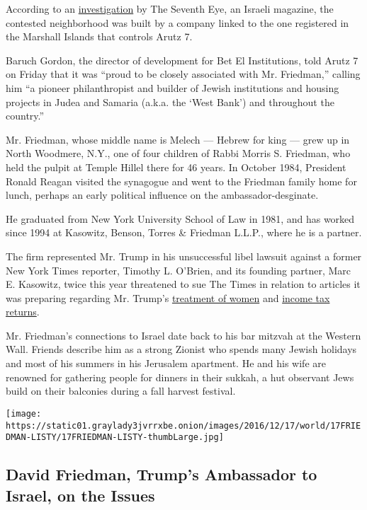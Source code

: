 According to an \href{http://www.the7eye.org.il/181976}{investigation}
by The Seventh Eye, an Israeli magazine, the contested neighborhood was
built by a company linked to the one registered in the Marshall Islands
that controls Arutz 7.

Baruch Gordon, the director of development for Bet El Institutions, told
Arutz 7 on Friday that it was ``proud to be closely associated with Mr.
Friedman,'' calling him ``a pioneer philanthropist and builder of Jewish
institutions and housing projects in Judea and Samaria (a.k.a. the `West
Bank') and throughout the country.''

Mr. Friedman, whose middle name is Melech --- Hebrew for king --- grew
up in North Woodmere, N.Y., one of four children of Rabbi Morris S.
Friedman, who held the pulpit at Temple Hillel there for 46 years. In
October 1984, President Ronald Reagan visited the synagogue and went to
the Friedman family home for lunch, perhaps an early political influence
on the ambassador-desginate.

He graduated from New York University School of Law in 1981, and has
worked since 1994 at Kasowitz, Benson, Torres \& Friedman L.L.P., where
he is a partner.

The firm represented Mr. Trump in his unsuccessful libel lawsuit against
a former New York Times reporter, Timothy L. O'Brien, and its founding
partner, Marc E. Kasowitz, twice this year threatened to sue The Times
in relation to articles it was preparing regarding Mr. Trump's
\href{https://www.nytimes3xbfgragh.onion/2016/05/15/us/politics/donald-trump-women.html}{treatment
of women} and
\href{https://www.nytimes3xbfgragh.onion/2016/10/02/us/politics/donald-trump-taxes.html?_r=0}{income
tax returns}.

Mr. Friedman's connections to Israel date back to his bar mitzvah at the
Western Wall. Friends describe him as a strong Zionist who spends many
Jewish holidays and most of his summers in his Jerusalem apartment. He
and his wife are renowned for gathering people for dinners in their
sukkah, a hut observant Jews build on their balconies during a fall
harvest festival.

\href{https://www.nytimes3xbfgragh.onion/interactive/2016/12/16/world/middleeast/David-Friedman-Israel-Palestinians-Trump-quotes.html}{}

\texttt{[image: https://static01.graylady3jvrrxbe.onion/images/2016/12/17/world/17FRIEDMAN-LISTY/17FRIEDMAN-LISTY-thumbLarge.jpg]}

\hypertarget{david-friedman-trumps-ambassador-to-israel-on-the-issues}{%
\subsection{David Friedman, Trump's Ambassador to Israel, on the
Issues}\label{david-friedman-trumps-ambassador-to-israel-on-the-issues}}

